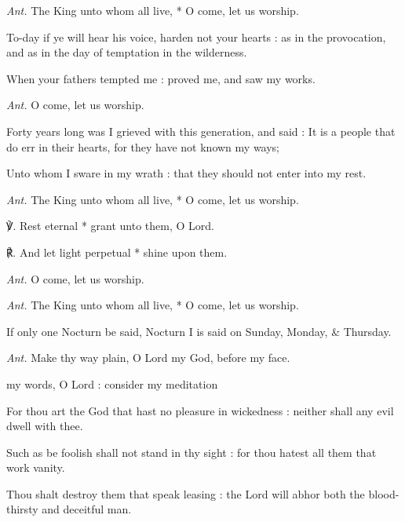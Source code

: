 \textit{Ant.} The King unto whom all live, * O come, let us worship.\par
{}To-day if ye will hear his voice, harden not your hearts : as in the provocation, and as in the day of temptation in the wilderness.\par
{}When your fathers tempted me : proved me, and saw my works.\par
\textit{Ant.} O come, let us worship.\par
{}Forty years long was I grieved with this generation, and said : It is a people that do err in their hearts, for they have not known my ways;\par
{}Unto whom I sware in my wrath : that they should not enter into my rest.\par
\textit{Ant.} The King unto whom all live, * O come, let us worship.\par
℣. Rest eternal * grant unto them, O Lord.\par
℟. And let light perpetual * shine upon them.\par
\textit{Ant.} O come, let us worship.\par\noindent
\textit{Ant.} The King unto whom all live, * O come, let us worship.\par
{}\par
\begin{rubric}
    {If only one Nocturn be said, Nocturn I is said on Sunday, Monday, \& Thursday.}
\end{rubric}
\par\noindent
\textit{Ant.} Make thy way plain, {\dag} O Lord my God, before my face.\par
{} my words, O Lord : consider my meditation\par
{}
For thou art the God that hast no pleasure in wickedness : neither shall any evil dwell with thee.\par
{}Such as be foolish shall not stand in thy sight : for thou hatest all them that work vanity.\par
{}Thou shalt destroy them that speak leasing : the Lord will abhor both the blood-thirsty and deceitful man.\par
